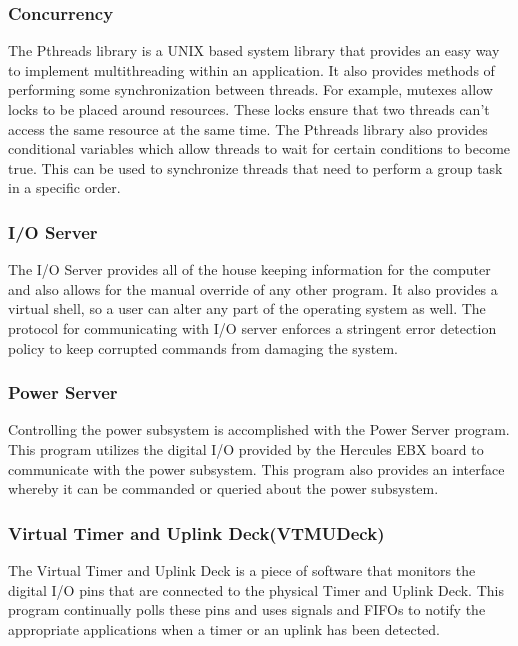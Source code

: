 \documentclass[11pt,titlepage]{article}
\begin{document}
\subsubsection{Concurrency}
The Pthreads library is a UNIX based system library that provides an easy way to implement multithreading within an application. It also provides
methods of performing some synchronization between threads. For example, mutexes allow locks to be placed around resources. These locks ensure that
two threads can't access the same resource at the same time. The Pthreads library also provides conditional variables which allow threads to wait for
certain conditions to become true. This can be used to synchronize threads that need to perform a group task in a specific order.  

\subsubsection{I/O Server}
The I/O Server provides all of the house keeping information for the computer and also allows for the manual override of any other program. It also
provides a virtual shell, so a user can alter any part of the operating system as well. The protocol for communicating with I/O server enforces a 
stringent error detection policy to keep corrupted commands from damaging the system.

\subsubsection{Power Server}
Controlling the power subsystem is accomplished with the Power Server program. This program utilizes the digital I/O provided by the Hercules EBX board to
communicate with the power subsystem. This program also provides an interface whereby it can be commanded or queried about the power subsystem.

\subsubsection{Virtual Timer and Uplink Deck(VTMUDeck)}
The Virtual Timer and Uplink Deck is a piece of software that monitors the digital I/O pins that are connected to the physical Timer and Uplink Deck. This
program continually polls these pins and uses signals and FIFOs to notify the appropriate applications when a timer or an uplink has been detected.
\end{document}
